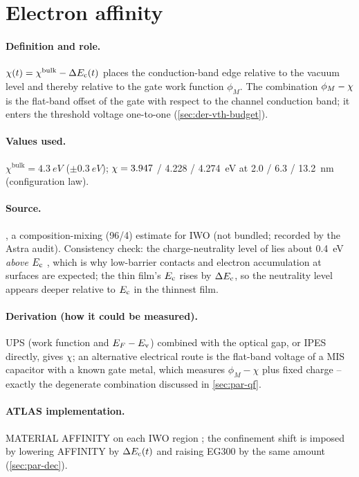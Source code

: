 \section{Electron affinity}
\label{sec:par-chi}

\paragraph{Definition and role.}
$\chi(t) = \chi^{\mathrm{bulk}} - \Delta E_{\mathrm{c}}(t)$ places the conduction-band edge relative to the vacuum level and
thereby relative to the gate work function $\phi_M$. The combination $\phi_M - \chi$ is the flat-band
offset of the gate with respect to the channel conduction band; it enters the threshold voltage one-to-one
(\cref{sec:der-vth-budget}).

\paragraph{Values used.}
$\chi^{\mathrm{bulk}} = \SI{4.3}{eV}$ ($\pm\SI{0.3}{eV}$); $\chi = 3.947$ / 4.228 / 4.274~eV at
2.0 / 6.3 / 13.2~nm (configuration law).

\paragraph{Source.}
\citet[Sec.~3]{Fan2021}, a composition-mixing (96/4) estimate for IWO (not bundled; recorded by the Astra
audit). Consistency check: the charge-neutrality level of \InO{} lies about 0.4~eV \emph{above} $E_{\mathrm{c}}$
\citep[pp.~503--504]{Si2021}, which is why low-barrier contacts and electron accumulation at \InO{} surfaces are
expected; the thin film's $E_{\mathrm{c}}$ rises by $\Delta E_{\mathrm{c}}$, so the neutrality level appears deeper relative to $E_{\mathrm{c}}$ in
the thinnest film.

\paragraph{Derivation (how it could be measured).}
UPS (work function and $E_F-E_{\mathrm{v}}$) combined with the optical gap, or IPES directly, gives $\chi$; an
alternative electrical route is the flat-band voltage of a MIS capacitor with a known gate metal, which
measures $\phi_M - \chi$ plus fixed charge -- exactly the degenerate combination discussed in
\cref{sec:par-qf}.

\paragraph{ATLAS implementation.}
MATERIAL AFFINITY on each IWO region \citep[p.~1337]{AtlasManual}; the confinement shift is imposed by
lowering AFFINITY by $\Delta E_{\mathrm{c}}(t)$ and raising EG300 by the same amount (\cref{sec:par-dec}).

